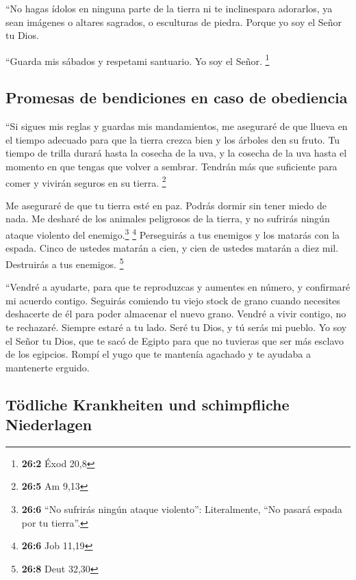  ``No hagas ídolos en ninguna parte de la tierra ni te
inclinespara adorarlos, ya sean imágenes o altares sagrados, o
esculturas de piedra. Porque yo soy el Señor tu Dios.

 ``Guarda mis sábados y respetami santuario. Yo soy el
Señor. \footnote{\textbf{26:2} Éxod 20,8}

\hypertarget{promesas-de-bendiciones-en-caso-de-obediencia}{%
\subsection{Promesas de bendiciones en caso de
obediencia}\label{promesas-de-bendiciones-en-caso-de-obediencia}}

 ``Si sigues mis reglas y guardas mis mandamientos,
 me aseguraré de que llueva en el tiempo adecuado para que
la tierra crezca bien y los árboles den su fruto.  Tu
tiempo de trilla durará hasta la cosecha de la uva, y la cosecha de la
uva hasta el momento en que tengas que volver a sembrar. Tendrán más que
suficiente para comer y vivirán seguros en su tierra. \footnote{\textbf{26:5}
  Am 9,13}

 Me aseguraré de que tu tierra esté en paz. Podrás dormir
sin tener miedo de nada. Me desharé de los animales peligrosos de la
tierra, y no sufrirás ningún ataque violento del enemigo.\footnote{\textbf{26:6}
  ``No sufrirás ningún ataque violento'': Literalmente, ``No pasará
  espada por tu tierra''.} \footnote{\textbf{26:6} Job 11,19}
 Perseguirás a tus enemigos y los matarás con la espada.
 Cinco de ustedes matarán a cien, y cien de ustedes
matarán a diez mil. Destruirás a tus enemigos. \footnote{\textbf{26:8}
  Deut 32,30}

 ``Vendré a ayudarte, para que te reproduzcas y aumentes
en número, y confirmaré mi acuerdo contigo.  Seguirás
comiendo tu viejo stock de grano cuando necesites deshacerte de él para
poder almacenar el nuevo grano.  Vendré a vivir contigo,
no te rechazaré.  Siempre estaré a tu lado. Seré tu Dios,
y tú serás mi pueblo.  Yo soy el Señor tu Dios, que te
sacó de Egipto para que no tuvieras que ser más esclavo de los egipcios.
Rompí el yugo que te mantenía agachado y te ayudaba a mantenerte
erguido.

\hypertarget{tuxf6dliche-krankheiten-und-schimpfliche-niederlagen}{%
\subsection{Tödliche Krankheiten und schimpfliche
Niederlagen}\label{tuxf6dliche-krankheiten-und-schimpfliche-niederlagen}}

